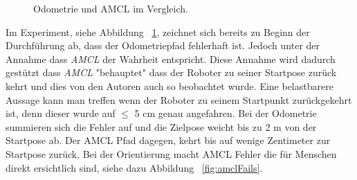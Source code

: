 \documentclass[11pt,a4paper]{article}
\begin{document}
{\begin{figure}[h]
	\centering
	\par\medskip
	\centering
	\par\medskip
	\caption{ Odometrie und AMCL im Vergleich. \label{fig:odo_amcl}}
\end{figure}

Im Experiment, siehe Abbildung ~\ref{fig:odo_amcl}, zeichnet sich bereits zu Beginn der Durchf\"uhrung ab, dass der Odometriepfad fehlerhaft ist. Jedoch unter der Annahme dass \textit{AMCL} der Wahrheit entspricht. Diese Annahme wird dadurch gestützt dass \textit{AMCL} "behauptet" dass der Roboter zu seiner Startpose zurück kehrt und dies von den Autoren auch so beobachtet wurde.  
Eine belastbarere Aussage kann man treffen wenn der Roboter zu seinem Startpunkt zurückgekehrt ist, denn dieser wurde auf $\leq$ 5 cm genau angefahren. Bei der Odometrie summieren sich die Fehler auf und die Zielpose weicht bis zu 2 m von der Startpose ab. 
Der AMCL Pfad dagegen, kehrt bis auf wenige Zentimeter zur Startpose zur\"uck. Bei der Orientierung macht AMCL Fehler die für Menschen direkt ersichtlich sind, siehe dazu Abbildung ~\ref{fig:amclFails}.

}
\end{document}
